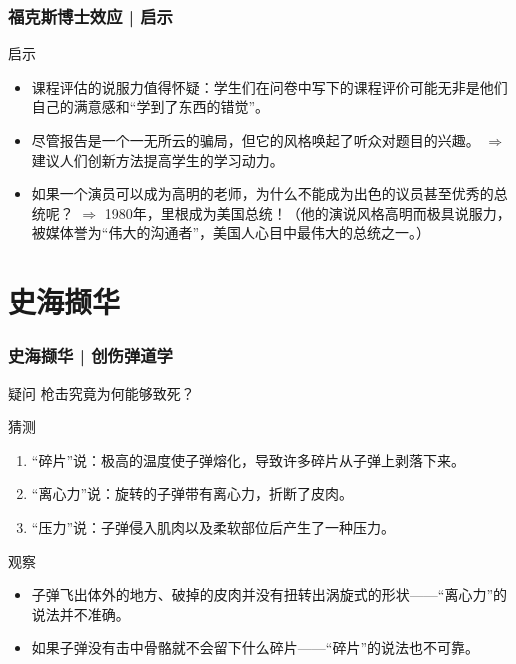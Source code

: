\begin{frame}
  \frametitle{福克斯博士效应 | 启示}
  \begin{block}{启示}
    \begin{itemize}
      \item 课程评估的说服力值得怀疑：学生们在问卷中写下的课程评价可能无非是他们自己的满意感和“学到了东西的错觉”。
      \item 尽管报告是一个一无所云的骗局，但它的风格唤起了听众对题目的兴趣。 $\Longrightarrow$ 建议人们创新方法提高学生的学习动力。
      \item 如果一个演员可以成为高明的老师，为什么不能成为出色的议员甚至优秀的总统呢？ $\Longrightarrow$ 1980年，里根成为美国总统！（他的演说风格高明而极具说服力，被媒体誉为“伟大的沟通者”，美国人心目中最伟大的总统之一。）
    \end{itemize}
  \end{block}
\end{frame}

% 
\section{}

% 
\section{}

% 
\section{}


\section{史海撷华}
\begin{frame}
  \frametitle{史海撷华 | 创伤弹道学}
  \begin{block}{疑问}
    枪击究竟为何能够致死？
  \end{block}
  \pause
  \begin{block}{猜测}
    \begin{enumerate}
      \item “碎片”说：极高的温度使子弹熔化，导致许多碎片从子弹上剥落下来。
      \item “离心力”说：旋转的子弹带有离心力，折断了皮肉。
      \item “压力”说：子弹侵入肌肉以及柔软部位后产生了一种压力。
    \end{enumerate}
  \end{block}
  \pause
  \begin{block}{观察}
    \begin{itemize}
      \item 子弹飞出体外的地方、破掉的皮肉并没有扭转出涡旋式的形状——“离心力”的说法并不准确。
      \item 如果子弹没有击中骨骼就不会留下什么碎片——“碎片”的说法也不可靠。
    \end{itemize}
  \end{block}
\end{frame}

